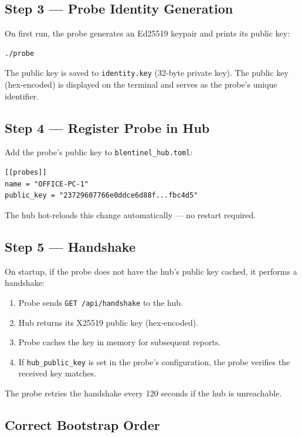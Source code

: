 \documentclass[12pt]{report}
\begin{document}
\subsection{Step 3 --- Probe Identity Generation}

On first run, the probe generates an Ed25519 keypair and prints its public key:

\begin{lstlisting}
./probe
\end{lstlisting}

The public key is saved to \texttt{identity.key} (32-byte private key). The
public key (hex-encoded) is displayed on the terminal and serves as the
probe's unique identifier.

\subsection{Step 4 --- Register Probe in Hub}

Add the probe's public key to \texttt{blentinel\_hub.toml}:

\begin{lstlisting}
[[probes]]
name = "OFFICE-PC-1"
public_key = "23729607766e0ddce6d88f...fbc4d5"
\end{lstlisting}

The hub hot-reloads this change automatically --- no restart required.

\subsection{Step 5 --- Handshake}

On startup, if the probe does not have the hub's public key cached, it
performs a handshake:

\begin{enumerate}
    \item Probe sends \texttt{GET /api/handshake} to the hub.
    \item Hub returns its X25519 public key (hex-encoded).
    \item Probe caches the key in memory for subsequent reports.
    \item If \texttt{hub\_public\_key} is set in the probe's configuration,
          the probe verifies the received key matches.
\end{enumerate}

The probe retries the handshake every 120 seconds if the hub is unreachable.

\subsection{Correct Bootstrap Order}
\end{document}
